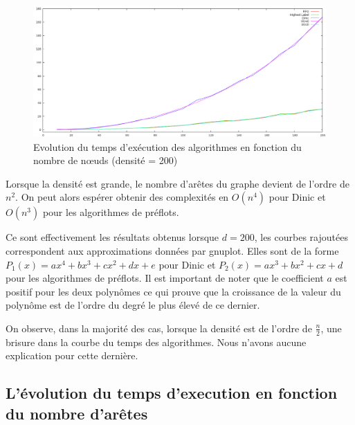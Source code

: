 \begin{figure}
\begin{center}
\includegraphics[scale=1.2]{../data_struct/results/ratio200b.png}
\end{center}
\caption{Evolution du temps d'exécution des algorithmes en fonction du nombre de n\oe uds (densité =
200)}
\label{d200}
\end{figure}

Lorsque la densité est grande, le nombre d'arêtes du graphe devient de l'ordre de $n^2$. On peut
alors espérer obtenir des complexités en $O(n^4)$ pour Dinic et $O(n^3)$ pour les algorithmes de
préflots.

Ce sont effectivement les résultats obtenus lorsque $d=200$, les courbes rajoutées correspondent aux
approximations données par gnuplot. Elles sont de la forme $P_1(x) = ax^4 + bx^3 +cx^2 +dx +e$ pour
Dinic et $P_2(x) = ax^3 + bx^2 + cx +d$ pour les algorithmes de préflots. Il est important de noter
que le coefficient $a$ est positif pour les deux polynômes ce qui prouve que la croissance de la
valeur du polynôme est de l'ordre du degré le plus élevé de ce dernier.

On observe, dans la majorité des cas, lorsque la densité est de l'ordre de $\frac{n}{2}$, une
brisure dans la courbe du temps des algorithmes. Nous n'avons aucune explication pour cette
dernière.

\subsection{L'évolution du temps d'execution en fonction du nombre d'arêtes}

